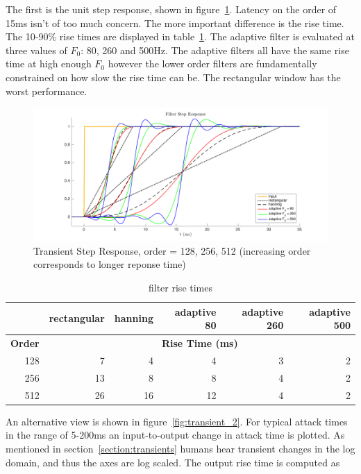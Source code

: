 \documentclass [11pt, proquest,oneside] {ganter_thesis}[2015/03/03]
\begin{document}
The first is the unit step response, shown in figure~\ref{fig:transient_1}.  Latency on the order of 15ms isn't of too much concern.  The more important difference is the rise time.  The 10-90\% rise times are displayed in table~\ref{table:rise_times}.  The adaptive filter is evaluated at three values of $F_0$: 80, 260 and 500Hz.  The adaptive filters all have the same rise time at high enough $F_0$ however the lower order filters are fundamentally constrained on how slow the rise time can be.  The rectangular window has the worst performance.

\begin{figure}[!ht]
  \centering
    \includegraphics[width=1\textwidth]{transient_1}
    \caption{Transient Step Response, order = 128, 256, 512 (increasing order corresponds to longer reponse time)}\label{fig:transient_1}
\end{figure}

\begin{table}
\begin{center}
\begin{tabular}{| r | r | r | r | r | r |}
  \hline
    & rectangular & hanning & adaptive 80 & adaptive 260 & adaptive 500 \\ \hline
  \textbf{Order} & \multicolumn{5}{|c|}{\textbf{Rise Time (ms)}} \\ \hline
  128 & 7 & 4 & 4 & 3 & 2 \\ \hline
  256 & 13 & 8 & 8 & 4 & 2 \\ \hline
  512 & 26 & 16 & 12 & 4 & 2 \\ \hline
\end{tabular}
\end{center}
\caption{filter rise times}\label{table:rise_times}
\end{table}

An alternative view is shown in figure~\ref{fig:transient_2}.  For typical attack times in the range of 5-200ms an input-to-output change in attack time is plotted.  As mentioned in section~\ref{section:transients} humans hear transient changes in the log domain, and thus the axes are log scaled.  The output rise time is computed as
\end{document}
